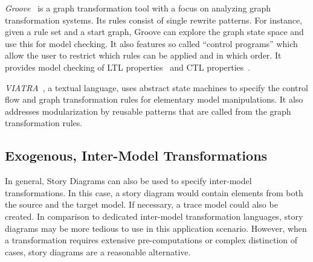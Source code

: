 \emph{Groove}~\cite{Ren04a} is a graph transformation tool with a focus on analyzing graph transformation systems.
Its rules consist of single rewrite patterns.
For instance, given a rule set and a start graph, Groove can explore the graph state space and use this for model checking.
It also features so called ``control programs'' which allow the user to restrict which rules can be applied and in which order. It provides model checking of LTL properties~\cite{Ren08} and CTL properties~\cite{KR06}.

\emph{VIATRA}~\cite{viatra}, a textual language, uses abstract state machines to specify the control flow and graph transformation rules for elementary model manipulations.
It also addresses modularization by reusable patterns that are called from the graph transformation rules. 



\subsection{Exogenous, Inter-Model Transformations}

In general, Story Diagrams can also be used to specify inter-model transformations.
In this case, a story diagram would contain elements from both the source and the target model.
If necessary, a trace model could also be created.
In comparison to dedicated inter-model transformation languages, story diagrams may be more tedious to use in this application scenario.
However, when a transformation requires extensive pre-computations or complex distinction of cases, story diagrams are a reasonable alternative.

